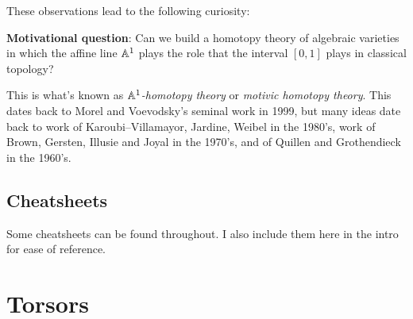 \documentclass[11pt,openany]{book}
\begin{document}
These observations lead to the following curiosity:

\textbf{Motivational question}: Can we build a homotopy theory of algebraic varieties in which the affine line $\mathbb{A}^1$ plays the role that the interval $[0,1]$ plays in classical topology?

This is what's known as \textit{$\mathbb{A}^1$-homotopy theory} or \textit{motivic homotopy theory}. This dates back to Morel and Voevodsky's seminal work in 1999, but many ideas date back to work of Karoubi--Villamayor, Jardine, Weibel in the 1980's, work of Brown, Gersten, Illusie and Joyal in the 1970's, and of Quillen and Grothendieck in the 1960's.








\section{Cheatsheets}

Some cheatsheets can be found throughout. I also include them here in the intro for ease of reference.







\chapter{Torsors}
\minitoc
\end{document}
